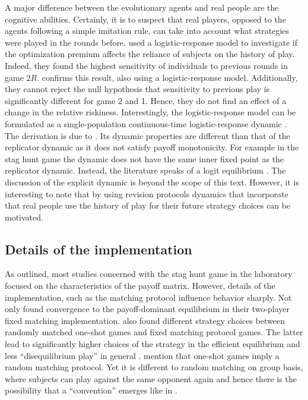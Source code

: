 A major difference between the evolutionary agents and 
real people are the cognitive abilities.
Certainly, it is to suspect that real players, opposed to the agents
following a simple imitation rule, can take into account what strategies 
were played in the rounds before.
\textcite{battalio_optimization_2001} used a logistic-response model to
investigate if the optimization premium affects the reliance of subjects
on the history of play. Indeed, they found the highest sensitivity of 
individuals to previous rounds in game $2R$.
\textcite{dubois_optimization_2012} confirms this result, also using 
a logistic-response model. Additionally, they cannot reject the null
hypothesis that sensitivity to previous play is significantly different for
game 2 and 1. Hence, they do not find an effect of a change in the
relative riskiness. Interestingly, the logistic-response model can be
formulated as a single-population continuous-time logistic-response dynamic
\parencite[752]{battalio_optimization_2001}. The derivation is due to
\textcite{fudenberg_theory_1998}. Its dynamic properties are different
than that of the replicator dynamic as it does not satisfy payoff monotonicity.
For example in the stag hunt game the dynamic does not have the same inner
fixed point as the replicator dynamic. Instead, the literature speaks
of a logit equilibrium \textcite{battalio_optimization_2001}. The discussion
of the explicit dynamic is beyond the scope of this text. 
However, it is interesting
to note that by using revision protocols dynamics that incorporate that 
real people use the history of play for their future strategy 
choices can be motivated.


\subsection{Details of the implementation}
As outlined, most studies concerned with the stag hunt game in the 
laboratory focused on the characteristics of the payoff matrix. 
However, details of the implementation,
such as the matching protocol influence behavior sharply. Not only 
\textcite{van_huyck_tacit_1990} found 
convergence to the payoff-dominant equilibrium in their two-player 
fixed matching implementation.  
\textcite{clark_repetition_2001} also found different strategy 
choices between randomly matched one-shot games and fixed matching protocol 
games. The latter lead to significantly higher choices of the strategy 
in the efficient equilibrium and less ``disequilibrium play'' in general
\parencite[]{clark_repetition_2001}. 
\textcite{devetag_when_2007} mention that one-shot games imply a 
random matching protocol. Yet it is different to random matching on group
basis, where subjects can play against the same opponent again 
and hence there is the possibility that a ``convention'' emerges like in 
\textcite{rankin_strategic_2000}.

